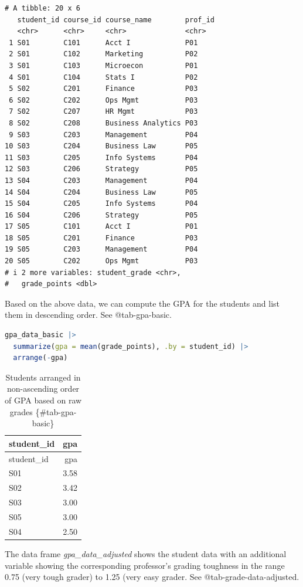 \documentclass[
  12pt,
  letterpaper,
  DIV=11,
  numbers=noendperiod]{scrreprt}
\begin{document}
\begin{lstlisting}
# A tibble: 20 x 6
   student_id course_id course_name        prof_id
   <chr>      <chr>     <chr>              <chr>  
 1 S01        C101      Acct I             P01    
 2 S01        C102      Marketing          P02    
 3 S01        C103      Microecon          P01    
 4 S01        C104      Stats I            P02    
 5 S02        C201      Finance            P03    
 6 S02        C202      Ops Mgmt           P03    
 7 S02        C207      HR Mgmt            P03    
 8 S02        C208      Business Analytics P03    
 9 S03        C203      Management         P04    
10 S03        C204      Business Law       P05    
11 S03        C205      Info Systems       P04    
12 S03        C206      Strategy           P05    
13 S04        C203      Management         P04    
14 S04        C204      Business Law       P05    
15 S04        C205      Info Systems       P04    
16 S04        C206      Strategy           P05    
17 S05        C101      Acct I             P01    
18 S05        C201      Finance            P03    
19 S05        C203      Management         P04    
20 S05        C202      Ops Mgmt           P03    
# i 2 more variables: student_grade <chr>,
#   grade_points <dbl>
\end{lstlisting}

Based on the above data, we can compute the GPA for the students and
list them in descending order. See @tab-gpa-basic.

\begin{lstlisting}[language=R]
gpa_data_basic |> 
  summarize(gpa = mean(grade_points), .by = student_id) |> 
  arrange(-gpa)
\end{lstlisting}

\begin{longtable}[]{@{}lr@{}}
\caption{Students arranged in non-ascending order of GPA based on raw
grades \{\#tab-gpa-basic\}}\tabularnewline
\toprule\noalign{}
student\_id & gpa \\
\midrule\noalign{}
\endfirsthead
\toprule\noalign{}
student\_id & gpa \\
\midrule\noalign{}
\endhead
\bottomrule\noalign{}
\endlastfoot
S01 & 3.58 \\
S02 & 3.42 \\
S03 & 3.00 \\
S05 & 3.00 \\
S04 & 2.50 \\
\end{longtable}

The data frame \emph{gpa\_data\_adjusted} shows the student data with an
additional variable showing the corresponding professor's grading
toughness in the range 0.75 (very tough grader) to 1.25 (very easy
grader. See @tab-grade-data-adjusted.
\end{document}
